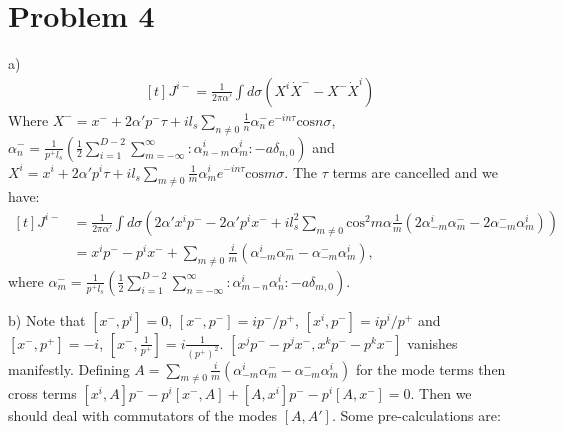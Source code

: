 \documentclass[12pt]{article}
\begin{document}
\section{Problem 4}
\begin{paragraph}{a)}
\begin{equation}
\begin{aligned}[t]
J^{i-}=\frac{1}{2\pi\alpha'}\int d\sigma (X^i \dot{X}^- - X^-\dot{X}^i)
\end{aligned}
\end{equation}
Where $X^-=x^-+2\alpha'p^-\tau+il_s\sum\limits_{n\neq 0}\frac{1}{n}\alpha_n^- e^{-in\tau}\text{cos}n\sigma$, $\alpha_n^-=\frac{1}{p^+l_s}(\frac{1}{2}\sum\limits_{i=1}^{D-2}\sum\limits_{m=-\infty}^{\infty}:\alpha_{n-m}^i\alpha_m^i:-a\delta_{n,0})$ and $X^i=x^i+2\alpha'p^i\tau+il_s\sum\limits_{m\neq 0}\frac{1}{m}\alpha_m^i e^{-in\tau}\text{cos}m\sigma$. The $\tau$ terms are cancelled and we have:
\begin{equation}
\begin{aligned}[t]
J^{i-}&=\frac{1}{2\pi\alpha'}\int d\sigma (2\alpha'x^i p^--2\alpha'p^i x^-+il_s^2\sum\limits_{m\neq 0}\text{cos}^2 m\alpha \frac{1}{m}(2\alpha_{-m}^i\alpha_m^- -2\alpha_{-m}^-\alpha_m^i))\\
&=x^i p^--p^i x^-+\sum\limits_{m\neq 0}\frac{i}{m}(\alpha_{-m}^i\alpha_m^- -\alpha_{-m}^-\alpha_m^i),
\end{aligned}
\end{equation}
where $\alpha_m^-=\frac{1}{p^+l_s}(\frac{1}{2}\sum\limits_{i=1}^{D-2}\sum\limits_{n=-\infty}^{\infty}:\alpha_{m-n}^i\alpha_n^i:-a\delta_{m,0})$.
\end{paragraph}
\begin{paragraph}{b)}
Note that $[x^-,p^i]=0$, $[x^-,p^-]=ip^-/p^+$, $[x^i,p^-]=ip^i/p^+$ and $[x^-,p^+]=-i$, $[x^-,\frac{1}{p^+} ]=i\frac{1}{(p^+)^2}$. $[x^j p^--p^j x^-,x^k p^--p^k x^-]$ vanishes manifestly. Defining $A=\sum\limits_{m\neq 0}\frac{i}{m}(\alpha_{-m}^i\alpha_m^- -\alpha_{-m}^-\alpha_m^i)$ for the mode terms then cross terms $[x^i,A]p^--p^i[x^-,A]+[A,x^i]p^--p^i[A,x^-]=0$. Then we should deal with commutators of the modes $[A,A']$. Some pre-calculations are:

\end{paragraph}
\end{document}
